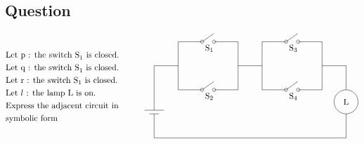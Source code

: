 \documentclass[17pt]{extarticle}
\begin{document}
\begin{fleqn}
\section{Question}

\begin{equation} \nonumber
\begin{alignedat}{4}
& \text{Let p : the switch S}_1 \text{ is closed.} \\
& \text{Let q : the switch S}_1 \text{ is closed.} \\
& \text{Let r : the switch S}_1 \text{ is closed.} \\
& \text{Let }l \text{ : the lamp L is on.}\\
& \text{Express the adjacent circuit in} \\
& \text{symbolic form} \\
\end{alignedat}
\quad\quad\quad
\begin{alignedat}{4}
\begin{tikzpicture}[dot/.style={circle,inner sep=1.4pt,draw}]

\draw (0,3) -- (1,3) -- (1,4) -- (2,4);
\node [dot] at (2,4) {};
\node [dot] at (2.5,4) {};
\draw (2,4) -- +(35:0.60);
\node at ( 2.3,4)[below]{S$_1$};


\draw (2.5,4)--(3.5,4) -- (3.5,2)--(2.5,2);
\node [dot] at (2.5,2) {};
\node [dot] at (2,2) {};
\draw (2,2) -- +(35:0.60);
\node at ( 2.3,2)[below]{S$_2$};

\draw (2,2) -- (1,2) -- (1,3);

\draw (3.5,3) -- (4.5,3) -- (4.5,4) --(5.5,4);

\node [dot] at (5.5,4) {};
\draw (5.5,4) -- +(35:0.60);
\node [dot] at (6,4) {};
\node at (5.8,4)[below]{S$_3$};

\draw (6,4)--(7,4) -- (7,2)--(6,2);
\node [dot] at (6,2) {};
\node [dot] at (5.5,2) {};
\draw (5.5,2) -- +(35:0.60);
\node at ( 5.8,2)[below]{S$_4$};

\draw (5.5,2) -- (4.5,2) -- (4.5,3);
\draw (7,3) -- (8,3)--(8,2);
\draw (8,1.5) circle(0.5);
\draw (8,1.5)node {L};
\draw (8,1)--(8,0)--(0,0)--(0,1);

\draw (-0.4,1.15)--(0.4,1.15);
\draw (-0.2,1)--(0.2,1);

\draw (0,1.15)--(0,3);
\end{tikzpicture}
\end{alignedat}
\end{equation}
\quad
\vspace*{-5mm}


\end{fleqn}
\end{document}
